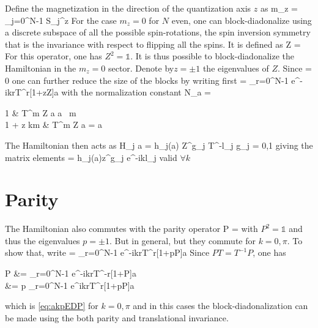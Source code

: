     	Define the magnetization in the direction of the quantization axis $z$ as
    	\be m_z = \sum_{j=0}^{N-1} S_j^z \ee
    	For the case $m_z=0$ for $N$ even, one can block-diadonalize using a discrete subspace of all the possible spin-rotations, the spin inversion symmetry that is the invariance with respect to flipping all the spins. It is defined as
   		\be Z  =  \ee
   		For this operator, one has $Z^2=\mathbb 1$. It is thus possible to block-diadonalize the Hamiltonian in the $m_z=0$ sector. Denote by$z=\pm 1$ the eigenvalues of $Z$. Since
   		\be [Z,T] = 0 \ee
   		one can further reduce the size of the blocks by writing first
   		\be {} =  \sum_{r=0}^{N-1} e^{-ikr}T^r[1+zZ]\ket a \ee
   		with the normalization constant
   		\be N_a =  \begin{cases} 1 & T^m Z \ket a \neq \ket a \ \forall m \\ 1 + z \cos km & T^m Z \ket a = \ket a \end{cases} \ee 
   		The Hamiltonian then acts as
   		\be \mc H_j \ket a = h_j(a) Z^{g_j} T^{-l_j}   g_j = 0,1 \ee
   		giving the matrix elements
   		\be {} = h_j(a)z^{g_j} e^{-ikl_j}  \ee
   		valid $\forall k$

   	\section{Parity}

   		The Hamiltonian also commutes with the parity operator
   		\be P  =  \ee
   		with $P^2=\mathbb 1$ and thus the eigenvalues $p=\pm 1$. But
 		\be [P,T]  \ee
 		in general, but they commute for $k=0,\pi$. To show that, write
 		\be {} =  \sum_{r=0}^{N-1} e^{-ikr}T^r[1+pP]\ket a  \label{eq:akpEDP} \ee
 		Since $PT = T^{-1}P$, one has
 		\be \begin{split} P &=  \sum_{r=0}^{N-1} e^{-ikr}T^-r[1+P]\ket a \\ &= p \sum_{r=0}^{N-1} e^{ikr}T^r[1+pP]\ket a \end{split} \ee
 		which is \eqref{eq:akpEDP} for $k=0,\pi$ and in this cases the block-diadonalization can be made using the both parity and translational invariance.

